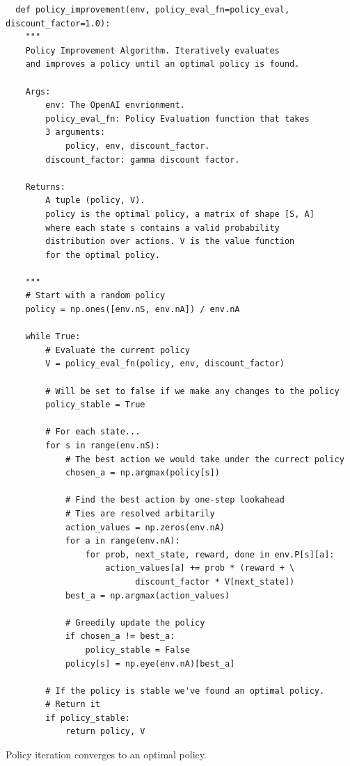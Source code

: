 \documentclass[graybox]{svmult}
\begin{document}
\begin{verbatim}
  def policy_improvement(env, policy_eval_fn=policy_eval, discount_factor=1.0):
    """
    Policy Improvement Algorithm. Iteratively evaluates 
    and improves a policy until an optimal policy is found.

    Args:
        env: The OpenAI envrionment.
        policy_eval_fn: Policy Evaluation function that takes 
        3 arguments:
            policy, env, discount_factor.
        discount_factor: gamma discount factor.

    Returns:
        A tuple (policy, V).
        policy is the optimal policy, a matrix of shape [S, A] 
        where each state s contains a valid probability 
        distribution over actions. V is the value function 
        for the optimal policy.

    """
    # Start with a random policy
    policy = np.ones([env.nS, env.nA]) / env.nA

    while True:
        # Evaluate the current policy
        V = policy_eval_fn(policy, env, discount_factor)

        # Will be set to false if we make any changes to the policy
        policy_stable = True

        # For each state...
        for s in range(env.nS):
            # The best action we would take under the currect policy
            chosen_a = np.argmax(policy[s])

            # Find the best action by one-step lookahead
            # Ties are resolved arbitarily
            action_values = np.zeros(env.nA)
            for a in range(env.nA):
                for prob, next_state, reward, done in env.P[s][a]:
                    action_values[a] += prob * (reward + \
                          discount_factor * V[next_state])
            best_a = np.argmax(action_values)

            # Greedily update the policy
            if chosen_a != best_a:
                policy_stable = False
            policy[s] = np.eye(env.nA)[best_a]

        # If the policy is stable we've found an optimal policy. 
        # Return it
        if policy_stable:
            return policy, V
\end{verbatim}

\begin{theorem}
Policy iteration converges to an optimal policy.
\end{theorem}
\end{document}
